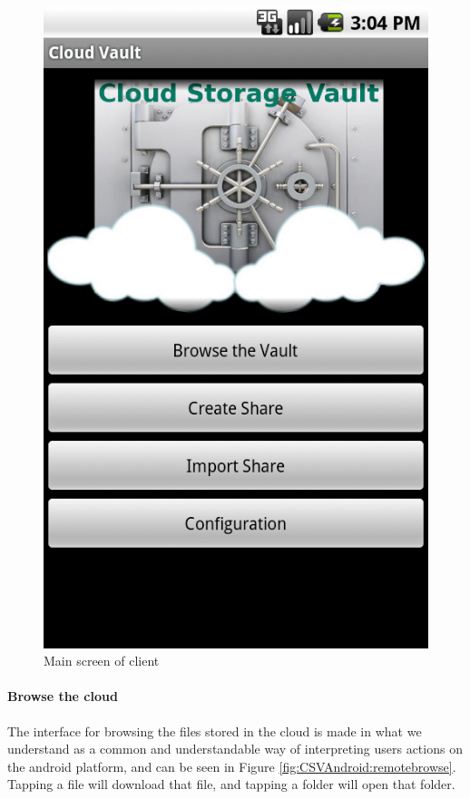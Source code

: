 \documentclass[pdftex,english,10pt,b5paper,twoside]{book}
\begin{document}
\begin{figure}[h!]
    \centering
    \includegraphics[scale=0.4]{client-mainscreen.png}
    \caption{Main screen of client}
    \label{fig:CSVAndroid:mainscreen}
\end{figure}

\paragraph{Browse the cloud} 

The interface for browsing the files stored in the cloud is made in what we
understand as a common and understandable way of interpreting users actions on
the android platform, and can be seen in Figure
\ref{fig:CSVAndroid:remotebrowse}. Tapping a file will download that file, and
tapping a folder will open that folder. 
\end{document}
